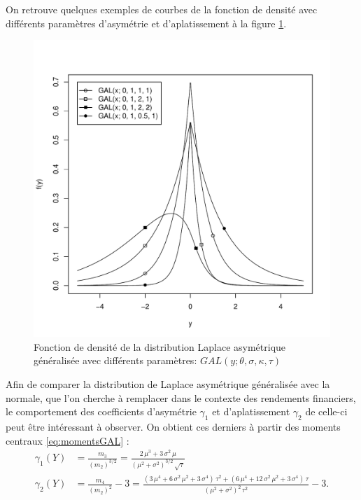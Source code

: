 On retrouve quelques exemples de courbes de la fonction de densité
avec différents paramètres d'asymétrie et d'aplatissement à la figure
\ref{fig:densiteGAL}.
\begin{figure}[!ht]
  \centering
  \includegraphics[scale=0.8]{../graphiques/dGAL-exemples.pdf}
  \caption{Fonction de densité de la distribution Laplace asymétrique
    généralisée avec différents paramètres:
    $GAL(y;\theta,\sigma,\kappa,\tau)$}
  \label{fig:densiteGAL}
\end{figure}

Afin de comparer la distribution de Laplace asymétrique généralisée
avec la normale, que l'on cherche à remplacer dans le contexte des
rendements financiers, le comportement des coefficients d'asymétrie
$\gamma_1$ et d'aplatissement $\gamma_2$ de celle-ci peut être
intéressant à observer. On obtient ces derniers à partir des moments
centraux \eqref{eq:momentsGAL} :
\begin{subequations}\label{eq:moments56GAL}
  \begin{align}
    \gamma_1(Y) &= \frac{m_3}{(m_2)^{3/2}} =
    \frac{2\,{\mu}^{3}+3\,{\sigma}^{2}\,\mu}{{\left( {\mu}^{2}+{\sigma}^{2}\right) }^{3/2}\,\sqrt{\tau}}\label{eq:moments5GAL}\\
    \gamma_2(Y) &= \frac{m_4}{(m_2)^{2}} - 3 = \frac{\left(
        3\,{\mu}^{4}+6\,{\sigma}^{2}\,{\mu}^{2}+3\,{\sigma}^{4}\right)
      \,{\tau}^{2}+\left(
        6\,{\mu}^{4}+12\,{\sigma}^{2}\,{\mu}^{2}+3\,{\sigma}^{4}\right)
      \,\tau}{{\left( {\mu}^{2}+{\sigma}^{2}\right) }^{2}\,{\tau}^{2}}
    - 3.\label{eq:moments6GAL}
  \end{align}
\end{subequations}


